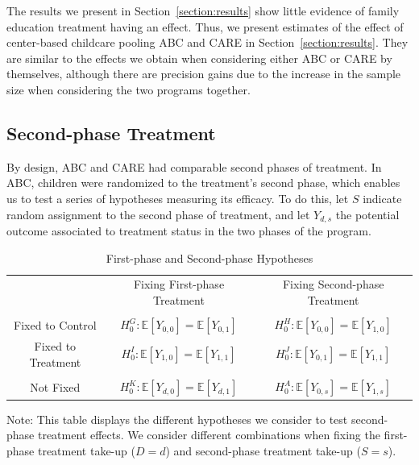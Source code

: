 \noindent The results we present in Section~\ref{section:results} show little evidence of family education treatment having an effect. Thus, we present estimates of the effect of center-based childcare pooling ABC and CARE in Section~\ref{section:results}. They are similar to the effects we obtain when considering either ABC or CARE by themselves, although there are precision gains due to the increase in the sample size when considering the two programs together. 


\subsection{Second-phase Treatment}

\noindent By design, ABC and CARE had comparable second phases of treatment. In ABC, children were randomized to the treatment's second phase, which enables us to test a series of hypotheses measuring its efficacy. To do this, let $S$ indicate random assignment to the second phase of treatment, and let $Y_{d,s}$ the potential outcome associated to treatment status in the two phases of the program.

\begin{table}[H] 
\begin{threeparttable}
\caption{First-phase and Second-phase Hypotheses}
\label{table:hypotheses}
\centering 
\begin{tabular}{ccc} \toprule
 & Fixing First-phase Treatment & Fixing Second-phase Treatment \\ \\ \midrule
Fixed to Control       & $H_{0}^G: \mathbb{E} \left[ Y_{0,0} \right] = \mathbb{E} \left[ Y_{0,1} \right]$ & $H_{0}^H: \mathbb{E} \left[ Y_{0,0} \right] = \mathbb{E} \left[ Y_{1,0} \right]$ \\
Fixed to Treatment  & $H_{0}^I: \mathbb{E} \left[ Y_{1,0} \right] = \mathbb{E} \left[ Y_{1,1} \right]$ & $H_{0}^J: \mathbb{E} \left[ Y_{0,1} \right] = \mathbb{E} \left[ Y_{1,1} \right]$ \\ \\ \midrule
Not Fixed                 & $H_{0}^K: \mathbb{E} \left[ Y_{d,0} \right] = \mathbb{E} \left[ Y_{d,1} \right]$ &  $H_{0}^A: \mathbb{E} \left[ Y_{0,s} \right] = \mathbb{E} \left[ Y_{1,s} \right]$ \\  \toprule
\end{tabular}
\begin{tablenotes}
\footnotesize
\item Note: This table displays the different hypotheses we consider to test second-phase treatment effects. We consider different combinations when fixing the first-phase treatment take-up ($D=d$) and second-phase treatment take-up ($S=s$).
\end{tablenotes}
\end{threeparttable}
\end{table}

